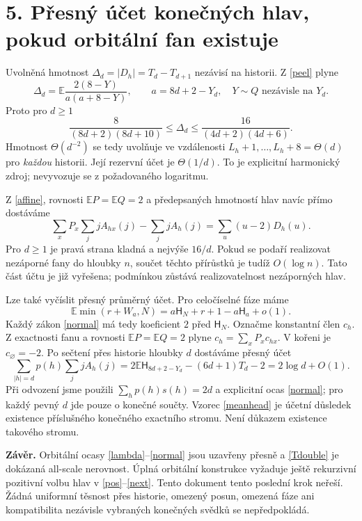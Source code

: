 \documentclass[11pt,a4paper]{article}
\newcommand{\E}{\mathbb E}
\newcommand{\HH}{\mathsf H}
\begin{document}
\section*{5. Přesný účet konečných hlav, pokud orbitální fan existuje}
Uvolněná hmotnost $\Delta_d=|D_h|=T_d-T_{d+1}$ nezávisí na historii.
Z \eqref{peel} plyne
\[
 \Delta_d=\E\frac{2(8-Y)}{a(a+8-Y)},\qquad
 a=8d+2-Y_d,\quad Y\sim Q\text{ nezávisle na }Y_d.
\]
Proto pro $d\ge1$
\[
 \frac{8}{(8d+2)(8d+10)}\le\Delta_d
 \le\frac{16}{(4d+2)(4d+6)}.
\]
Hmotnost $\Theta(d^{-2})$ se tedy uvolňuje ve vzdálenosti
$L_h+1,\ldots,L_h+8=\Theta(d)$ pro \emph{každou} historii.
Její rezervní účet je $\Theta(1/d)$. To je explicitní harmonický
zdroj; nevyvozuje se z požadovaného logaritmu.

Z \eqref{affine}, rovnosti $\E P=\E Q=2$ a předepsaných hmotností hlav
navíc přímo dostáváme
\begin{equation}\label{headincrement}
 \boxed{
 \sum_xP_x\sum_j j A_{hx}(j)-\sum_j j A_h(j)
 =\sum_u(u-2)D_h(u).}
\end{equation}
Pro $d\ge1$ je pravá strana kladná a nejvýše $16/d$.
Pokud se podaří realizovat nezáporné fany do hloubky $n$, součet těchto
přírůstků je tudíž $O(\log n)$. Tato část účtu je již vyřešena; podmínkou
zůstává realizovatelnost nezáporných hlav.

Lze také vyčíslit přesný průměrný účet. Pro celočíselné fáze máme
\[
 \E\min(r+W_a,N)=a\HH_N+r+1-a\HH_a+o(1).
\]
Každý zákon \eqref{normal} má tedy koeficient $2$ před $\HH_N$.
Označme konstantní člen $c_h$. Z exactnosti fanu a rovnosti
$\E P=\E Q=2$ plyne $c_h=\sum_xP_xc_{hx}$. V kořeni je $c_\varnothing=-2$.
Po sečtení přes historie hloubky $d$ dostáváme přesný účet
\begin{equation}\label{meanhead}
 \boxed{
 \sum_{|h|=d}p(h)\sum_j j A_h(j)
 =2\E\HH_{8d+2-Y_d}-(6d+1)T_d-2
 =2\log d+O(1).}
\end{equation}
Při odvození jsme použili $\sum_hp(h)s(h)=2d$ a explicitní ocas
\eqref{normal}; pro každý pevný $d$ jde pouze o konečné součty.
Vzorec \eqref{meanhead} je účetní důsledek existence příslušného konečného
exactního stromu. Není důkazem existence takového stromu.

\medskip
\noindent\textbf{Závěr.}
Orbitální ocasy \eqref{lambda}--\eqref{normal} jsou uzavřeny přesně a
\eqref{Tdouble} je dokázaná all-scale nerovnost. Úplná orbitální
konstrukce vyžaduje ještě rekurzivní pozitivní volbu hlav v
\eqref{pos}--\eqref{next}. Tento dokument tento poslední krok neřeší.
Žádná uniformní těsnost přes historie, omezený posun, omezená fáze ani
kompatibilita nezávisle vybraných konečných svědků se nepředpokládá.
\end{document}
